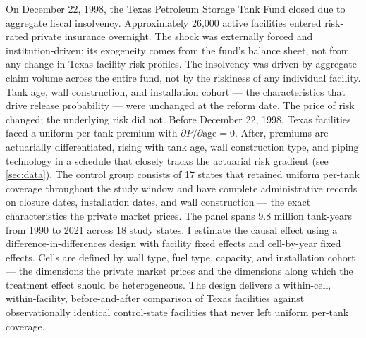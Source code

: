 \documentclass[
  12pt,
]{article}
\begin{document}
On December 22, 1998, the Texas Petroleum Storage Tank Fund closed due
to aggregate fiscal insolvency. Approximately 26,000 active facilities
entered risk-rated private insurance overnight. The shock was externally
forced and institution-driven; its exogeneity comes from the fund's
balance sheet, not from any change in Texas facility risk profiles. The
insolvency was driven by aggregate claim volume across the entire fund,
not by the riskiness of any individual facility. Tank age, wall
construction, and installation cohort --- the characteristics that drive
release probability --- were unchanged at the reform date. The price of
risk changed; the underlying risk did not. Before December 22, 1998,
Texas facilities faced a uniform per-tank premium with
\(\partial P / \partial \text{age} = 0\). After, premiums are
actuarially differentiated, rising with tank age, wall construction
type, and piping technology in a schedule that closely tracks the
actuarial risk gradient (see \autoref{sec:data}). The control group
consists of 17 states that retained uniform per-tank coverage throughout
the study window and have complete administrative records on closure
dates, installation dates, and wall construction --- the exact
characteristics the private market prices. The panel spans 9.8 million
tank-years from 1990 to 2021 across 18 study states. I estimate the
causal effect using a difference-in-differences design with facility
fixed effects and cell-by-year fixed effects. Cells are defined by wall
type, fuel type, capacity, and installation cohort --- the dimensions
the private market prices and the dimensions along which the treatment
effect should be heterogeneous. The design delivers a within-cell,
within-facility, before-and-after comparison of Texas facilities against
observationally identical control-state facilities that never left
uniform per-tank coverage.
\end{document}
